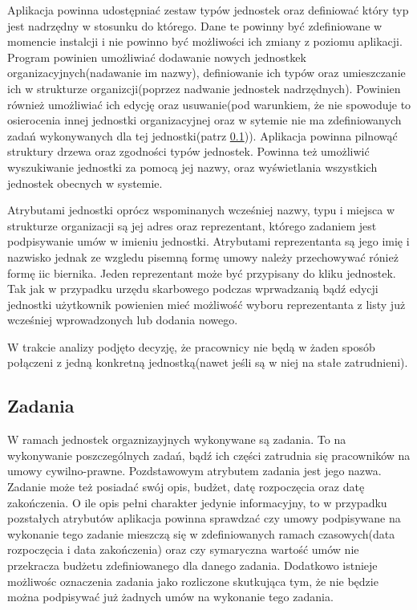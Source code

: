 Aplikacja powinna udostępniać zestaw typów jednostek oraz definiować który typ jest nadrzędny w stosunku do którego. Dane te powinny być zdefiniowane w momencie instalcji i nie powinno być możliwości ich zmiany z poziomu aplikacji. Program powinien umożliwiać dodawanie nowych jednostkek organizacyjnych(nadawanie im nazwy), definiowanie ich typów oraz umieszczanie ich w strukturze organizcji(poprzez nadwanie jednostek nadrzędnych). Powinien również umożliwiać ich edycję oraz usuwanie(pod warunkiem, że nie spowoduje to osierocenia innej jednostki organizacyjnej oraz w sytemie nie ma zdefiniowanych zadań wykonywanych dla tej jednostki(patrz \ref{zadania})). Aplikacja powinna pilnowąć struktury drzewa oraz zgodności typów jednostek. Powinna też umożliwić wyszukiwanie jednostki za pomocą jej nazwy, oraz wyświetlania wszystkich jednostek obecnych w systemie.

Atrybutami jednostki oprócz wspominanych wcześniej nazwy, typu i miejsca w strukturze organizacji są jej adres oraz reprezentant, którego zadaniem jest podpisywanie umów w imieniu jednostki. Atrybutami reprezentanta są jego imię i nazwisko jednak ze wzgledu pisemną formę umowy należy przechowywać rónież formę iic biernika. Jeden reprezentant może być przypisany do kliku jednostek. Tak jak w przypadku urzędu skarbowego podczas wprwadzanią bądź edycji jednostki użytkownik powienien mieć możliwość wyboru reprezentanta z listy już wcześniej wprowadzonych lub dodania nowego.

W trakcie analizy podjęto decyzję, że pracownicy nie będą w żaden sposób połączeni z jedną konkretną jednostką(nawet jeśli są w niej na stałe zatrudnieni).

\subsection[Zadania][Zadania]{Zadania}
\label{zadania}
W ramach jednostek orgaznizayjnych wykonywane są zadania. To na wykonywanie poszczególnych zadań, bądź ich części zatrudnia się pracowników na umowy cywilno-prawne. Pozdstawowym atrybutem zadania jest jego nazwa. Zadanie może też posiadać swój opis, budżet, datę rozpoczęcia oraz datę zakończenia. O ile opis pełni charakter jedynie informacyjny, to w przypadku pozstałych atrybutów aplikacja powinna sprawdzać czy umowy podpisywane na wykonanie tego zadanie mieszczą się w zdefiniowanych ramach czasowych(data rozpoczęcia i data zakończenia) oraz czy symaryczna wartość umów nie przekracza budżetu zdefiniowanego dla danego zadania. Dodatkowo istnieje możliwośc oznaczenia zadania jako rozliczone skutkująca tym, że nie będzie można podpisywać już żadnych umów na wykonanie tego zadania. 

